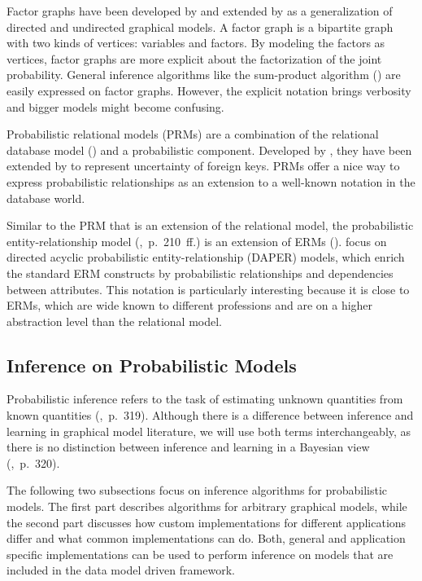 Factor graphs have been developed by \textcite{kschischang2001factor} and extended by \textcite{frey2002extending} as a generalization of directed and undirected graphical models. A factor graph is a bipartite graph with two kinds of vertices: variables and factors. By modeling the factors as vertices, factor graphs are more explicit about the factorization of the joint probability. General inference algorithms like the sum-product algorithm (\cite{pearl1988probabilistic}) are easily expressed on factor graphs. However, the explicit notation brings verbosity and bigger models might become confusing.

Probabilistic relational models (PRMs) are a combination of the relational database model (\cite{codd1970relational}) and a probabilistic component. Developed by \textcite{friedman1999learning}, they have been extended by \textcite{getoor2003learning} to represent uncertainty of foreign keys. PRMs offer a nice way to express probabilistic relationships as an extension to a well-known notation in the database world.

Similar to the PRM that is an extension of the relational model, the probabilistic entity-relationship model (\cite{heckerman2007probabilistic},~p.~210~ff.) is an extension of ERMs (\cite{chen1976entity}). \cite{heckerman2007probabilistic} focus on directed acyclic probabilistic entity-relationship (DAPER) models, which enrich the standard ERM constructs by probabilistic relationships and dependencies between attributes. This notation is particularly interesting because it is close to ERMs, which are wide known to different professions and are on a higher abstraction level than the relational model.

\subsection{Inference on Probabilistic Models}
\label{subsec:inference}

Probabilistic inference refers to the task of estimating unknown quantities from known quantities (\cite{murphy2012machine},~p.~319). Although there is a difference between inference and learning in graphical model literature, we will use both terms interchangeably, as there is no distinction between inference and learning in a Bayesian view (\cite{murphy2012machine},~p.~320).

The following two subsections focus on inference algorithms for probabilistic models. The first part describes algorithms for arbitrary graphical models, while the second part discusses how custom implementations for different applications differ and what common implementations can do. Both, general and application specific implementations can be used to perform inference on models that are included in the data model driven framework.

